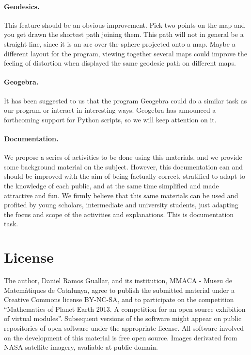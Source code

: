 \documentclass[a4paper,12pt]{article}
\begin{document}
\paragraph{Geodesics.} This feature should be an obvious improvement. Pick two points on the map and you get drawn the shortest path joining them. This path will not in general be a straight line, since it is an arc over the sphere projected onto a map. Maybe a different layout for the program, viewing together several maps could improve the feeling of distortion when displayed the same geodesic path on different maps.

\paragraph{Geogebra.} It has been suggested to us that the program Geogebra could do a similar task as our program or interact in interesting ways. Geogebra has announced a forthcoming support for Python scripts, so we will keep attention on it.

\paragraph{Documentation.} We propose a series of activities to be done using this materials, and we provide some background material on the subject. However, this documentation can and should be improved with the aim of being factually correct, stratified to adapt to the knowledge of each public, and at the same time simplified and made attractive and fun. We firmly believe that this same materials can be used and profited by young scholars, intermediate and university students, just adapting the focus and scope of the activities and explanations. This is documentation task.

\section{License}

The author, Daniel Ramos Guallar, and its institution, MMACA - Museu de Ma\-te\-mà\-ti\-ques de Catalunya, agree to publish the submitted
material under a Creative Commons license BY-NC-SA, and to participate on the competition ``Mathematics of Planet Earth 2013. A competition
for an open source exhibition of virtual modules''. Subsequent versions of the software might appear on public repositories of open software
under the appropriate license. All software involved on the development of this material is free open source. Images derivated from NASA
satellite imagery, avaliable at public domain.
\end{document}
